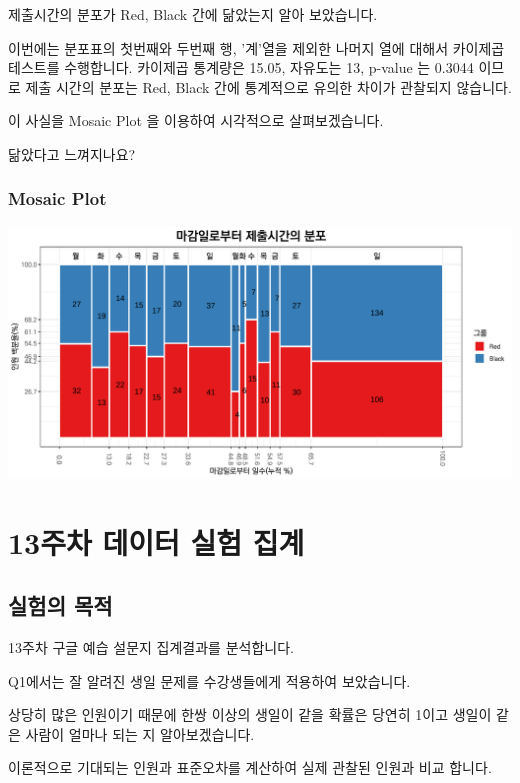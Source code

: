 \documentclass[
]{book}
\begin{document}
제출시간의 분포가 Red, Black 간에 닮았는지 알아 보았습니다.

이번에는 분포표의 첫번째와 두번째 행, '계'열을 제외한 나머지 열에 대해서 카이제곱테스트를 수행합니다. 카이제곱 통계량은 15.05, 자유도는 13, p-value 는 0.3044 이므로 제출 시간의 분포는 Red, Black 간에 통계적으로 유의한 차이가 관찰되지 않습니다.

이 사실을 Mosaic Plot 을 이용하여 시각적으로 살펴보겠습니다.

닮았다고 느껴지나요?

\subsection{Mosaic Plot}\label{mosaic-plot-28}

\includegraphics{Quiz_report_2025_files/figure-latex/unnamed-chunk-381-1.pdf}

\chapter{13주차 데이터 실험 집계}\label{uxc8fcuxcc28-uxb370uxc774uxd130-uxc2e4uxd5d8-uxc9d1uxacc4-11}

\section{실험의 목적}\label{uxc2e4uxd5d8uxc758-uxbaa9uxc801-14}

13주차 구글 예습 설문지 집계결과를 분석합니다.

Q1에서는 잘 알려진 생일 문제를 수강생들에게 적용하여 보았습니다.

상당히 많은 인원이기 때문에 한쌍 이상의 생일이 같을 확률은 당연히 1이고 생일이 같은 사람이 얼마나 되는 지 알아보겠습니다.

이론적으로 기대되는 인원과 표준오차를 계산하여 실제 관찰된 인원과 비교 합니다.
\end{document}
